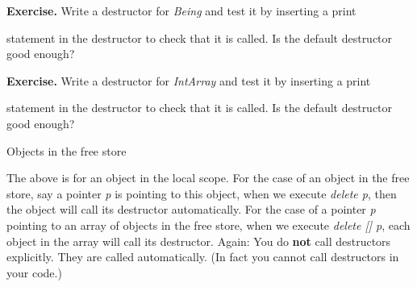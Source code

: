 \documentclass[
]{article}
\begin{document}
\textbf{Exercise.} Write a destructor for \emph{Being} and test it by
inserting a print

statement in the destructor to check that it is called. Is the default
destructor good enough?

\textbf{Exercise.} Write a destructor for \emph{IntArray} and test it by
inserting a print

statement in the destructor to check that it is called. Is the default
destructor good enough?

Objects in the free store

The above is for an object in the local scope. For the case of an object
in the free store, say a pointer \emph{p} is pointing to this object,
when we execute \emph{delete p}, then the object will call its
destructor automatically. For the case of a pointer \emph{p} pointing to
an array of objects in the free store, when we execute \emph{delete
{[}{]} p}, each object in the array will call its destructor. Again: You
do \textbf{not} call destructors explicitly. They are called
automatically. (In fact you cannot call destructors in your code.)
\end{document}
